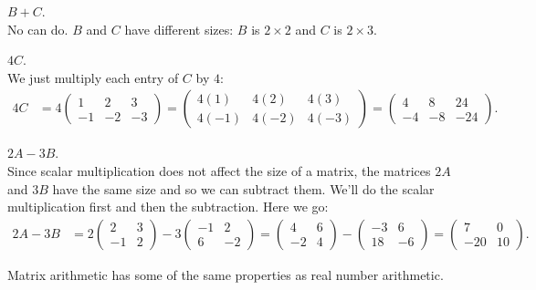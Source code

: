 \documentclass[12pt]{article}
\def\it{\item}
\def\lp{\left(} \def\rp{\right)} \def\abs#1{\vert #1 \vert}
\begin{document}
\it $B + C$. \\
No can do. $B$ and $C$ have different sizes: $B$ is $2 \times 2$ and $C$ is $2 \times 3$.
\it $4C$. \\
We just multiply each entry of $C$ by $4$: 
\begin{align*}
4C &= 4 \lp \begin{array}{rrr} 1 & 2 & 3 \\ -1 & -2 & -3 \end{array} \rp = \lp \begin{array}{ccc} 4 (1) & 4 (2) & 4 (3) \\ 4 (-1) & 4 (-2) & 4 (-3) \end{array} \rp
= \lp \begin{array}{rrr} 4 & 8 & 24 \\ -4 & -8 & -24 \end{array} \rp.
\end{align*}
\it $2A - 3B$. \\
Since scalar multiplication does not affect the size of a matrix, the matrices $2A$ and $3B$ have the same size and so we can subtract them. We'll do the scalar multiplication first and then the subtraction. Here we go: 
\begin{align*}
2A - 3B &= 
2 \lp \begin{array}{rr} 2 & 3 \\ -1 & 2 \end{array} \rp -
3 \lp \begin{array}{rr} -1 & 2 \\ 6 & -2 \end{array} \rp =
\lp \begin{array}{rr} 4 & 6 \\ -2 & 4 \end{array} \rp - 
\lp \begin{array}{rr} -3 & 6 \\ 18 & -6 \end{array} \rp = 
\lp \begin{array}{rr} 7 & 0 \\ -20 & 10 \end{array} \rp.
\end{align*}
\ee

Matrix arithmetic has some of the same properties as real number arithmetic.
\end{document}

